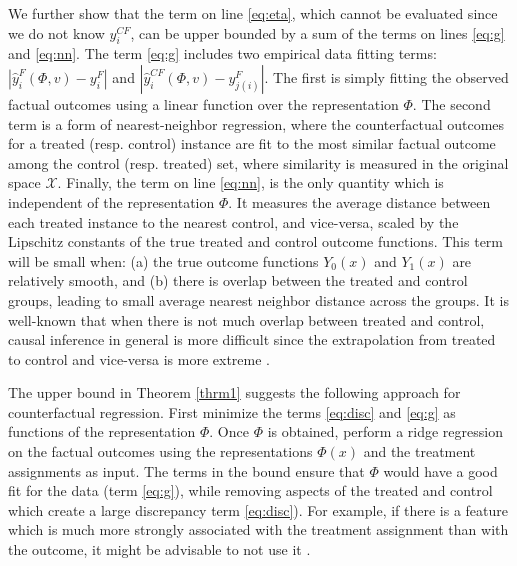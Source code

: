 We further show that the term on line \eqref{eq:eta}, which cannot be evaluated since we do not know $y^{CF}_i$, can be upper bounded by a sum of the terms on lines \eqref{eq:g} and \eqref{eq:nn}. The term \eqref{eq:g} includes two empirical data fitting terms: $| \hat{y}_i^F(\Phi,v)- y_i^F |$ and  $|\hat{y}_i^{CF}(\Phi,v)  - y_{j(i)}^F|$. The first is simply fitting the observed factual outcomes using a linear function over the representation $\Phi$. The second term is a form of nearest-neighbor regression, where the counterfactual outcomes for a treated (resp. control) instance are fit to the most similar factual outcome among the control (resp. treated) set, where similarity is measured in the original space $\mathcal{X}$.
Finally, the term on line \eqref{eq:nn}, is the only quantity which is independent of the representation $\Phi$. It measures the average distance between each treated instance to the nearest control, and vice-versa, scaled by the Lipschitz constants of the true treated and control outcome functions. This term will be small when: (a) the true outcome functions $Y_0(x)$ and $Y_1(x)$ are relatively smooth, and (b) there is overlap between the treated and control groups, leading to small average nearest neighbor distance across the groups. It is well-known that when there is not much overlap between treated and control, causal inference in general is more difficult since the extrapolation from treated to control and vice-versa is more extreme \citep{rosenbaum2009design}.

The upper bound in Theorem \ref{thrm1} suggests the following approach for counterfactual regression. First minimize the terms \eqref{eq:disc} and \eqref{eq:g} as functions of the representation $\Phi$. Once $\Phi$ is obtained, perform a ridge regression on the factual outcomes using the representations $\Phi(x)$ and the treatment assignments as input. The terms in the bound ensure that $\Phi$ would have a good fit for the data (term \eqref{eq:g}), while removing aspects of the treated and control which create a large discrepancy term \eqref{eq:disc}). For example, if there is a feature which is much more strongly associated with the treatment assignment than with the outcome, it might be advisable to not use it \cite{pearl2011invited}.

